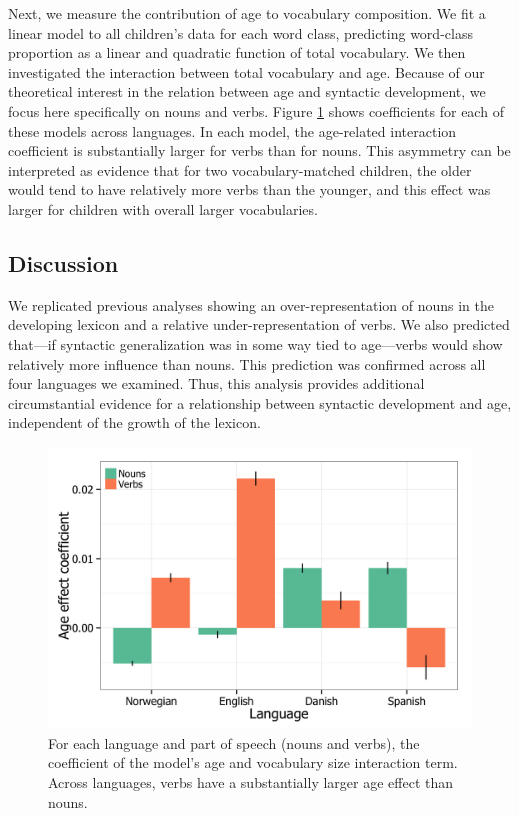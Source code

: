 \documentclass[10pt,letterpaper]{article}
\begin{document}
Next, we measure the contribution of age to vocabulary composition. We fit a linear model to all children's data for each word class, predicting word-class proportion as a linear and quadratic function of total vocabulary. We then investigated the interaction between total vocabulary and age. Because of our theoretical interest in the relation between age and syntactic development, we focus here specifically on nouns and verbs. Figure \ref{fig:coefs_noun_verb} shows coefficients for each of these models across languages. In each model, the age-related interaction coefficient is substantially larger for verbs than for nouns. This asymmetry can be interpreted as evidence that for two vocabulary-matched children, the older would tend to have relatively more verbs than the younger, and this effect was larger for children with overall larger vocabularies. 

\subsection{Discussion}

We replicated previous analyses \cite{bates1994} showing an over-representation of nouns in the developing lexicon and a relative under-representation of verbs. We also predicted that---if syntactic generalization was in some way tied to age---verbs would show relatively more influence than nouns. This prediction was confirmed across all four languages we examined. Thus, this analysis provides additional circumstantial evidence for a relationship between syntactic development and age, independent of the growth of the lexicon.

\begin{figure}[!tb]
\centering
\includegraphics[width=\linewidth]{plots/coefs_noun_verb.png}
\caption{\label{fig:coefs_noun_verb} For each language and part of speech (nouns and verbs), the coefficient of the model's age and vocabulary size interaction term. Across languages, verbs have a substantially larger age effect than nouns. }
\end{figure}
\end{document}
